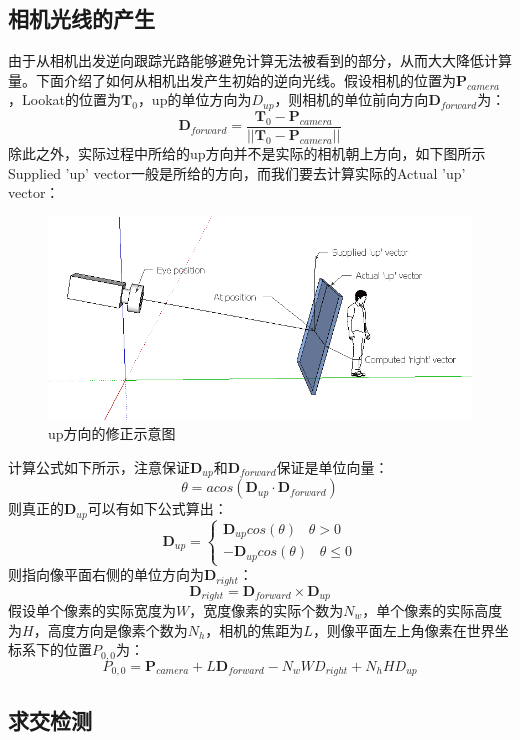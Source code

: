 \documentclass[10pt]{article}
\begin{document}
\subsection{相机光线的产生}
由于从相机出发逆向跟踪光路能够避免计算无法被看到的部分，从而大大降低计算量。下面介绍了如何从相机出发产生初始的逆向光线。假设相机的位置为$\bm{P}_{camera}$，Lookat的位置为$\bm{T}_0$，up的单位方向为$D_{up}$，则相机的单位前向方向$\bm{D}_{forward}$为：
$$\bm{D}_{forward}=\frac{\bm{T}_0-\bm{P}_{camera}}{||\bm{T}_0-\bm{P}_{camera}||}$$
除此之外，实际过程中所给的up方向并不是实际的相机朝上方向，如下图所示Supplied 'up' vector一般是所给的方向，而我们要去计算实际的Actual 'up' vector：
\begin{figure}[H]
\begin{center}
\includegraphics[scale=0.4]{up_adjust.png}
\caption{up方向的修正示意图}
\end{center}
\end{figure}
计算公式如下所示，注意保证$\bm{D}_{up}$和$\bm{D}_{forward}$保证是单位向量：
$$\theta=acos(\bm{D}_{up} \cdot \bm{D}_{forward})$$
则真正的$\bm{D}_{up}$可以有如下公式算出：
$$
\bm{D}_{up}=\left\{
\begin{array}{rl}
\bm{D}_{up}cos(\theta) \hspace{10pt} \theta >0 \\
-\bm{D}_{up}cos(\theta) \hspace{10pt} \theta \leq 0
\end{array}
\right.
$$
则指向像平面右侧的单位方向为$\bm{D}_{right}$：
$$\bm{D}_{right}=\bm{D}_{forward} \times \bm{D}_{up}$$
假设单个像素的实际宽度为$W$，宽度像素的实际个数为$N_{w}$，单个像素的实际高度为$H$，高度方向是像素个数为$N_{h}$，相机的焦距为$L$，则像平面左上角像素在世界坐标系下的位置$P_{0,0}$为：
$$P_{0,0}=\bm{P}_{camera}+L\bm{D}_{forward}-N_{w}WD_{right}+N_{h}HD_{up}$$

\subsection{求交检测}
\end{document}
